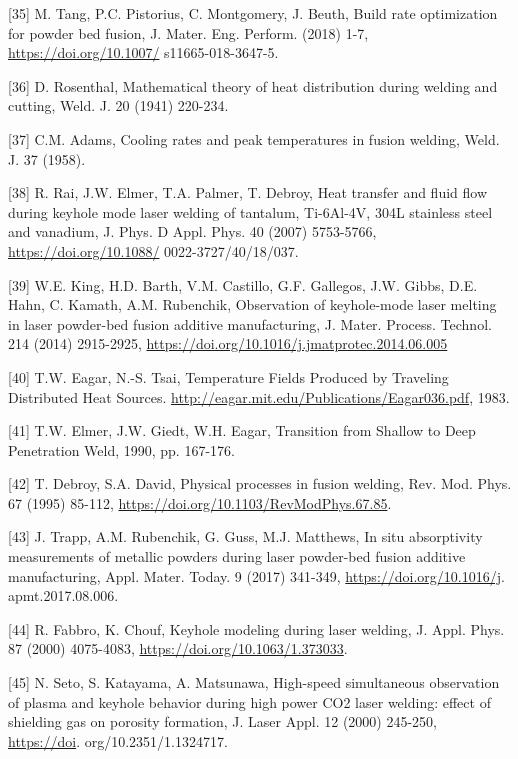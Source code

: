 \documentclass[10pt]{article}
\begin{document}
[35] M. Tang, P.C. Pistorius, C. Montgomery, J. Beuth, Build rate optimization for powder bed fusion, J. Mater. Eng. Perform. (2018) 1-7, \href{https://doi.org/10.1007/}{https://doi.org/10.1007/} s11665-018-3647-5.

[36] D. Rosenthal, Mathematical theory of heat distribution during welding and cutting, Weld. J. 20 (1941) 220-234.

[37] C.M. Adams, Cooling rates and peak temperatures in fusion welding, Weld. J. 37 (1958).

[38] R. Rai, J.W. Elmer, T.A. Palmer, T. Debroy, Heat transfer and fluid flow during keyhole mode laser welding of tantalum, Ti-6Al-4V, 304L stainless steel and vanadium, J. Phys. D Appl. Phys. 40 (2007) 5753-5766, \href{https://doi.org/10.1088/}{https://doi.org/10.1088/} 0022-3727/40/18/037.

[39] W.E. King, H.D. Barth, V.M. Castillo, G.F. Gallegos, J.W. Gibbs, D.E. Hahn, C. Kamath, A.M. Rubenchik, Observation of keyhole-mode laser melting in laser powder-bed fusion additive manufacturing, J. Mater. Process. Technol. 214 (2014) 2915-2925, \href{https://doi.org/10.1016/j.jmatprotec.2014.06.005}{https://doi.org/10.1016/j.jmatprotec.2014.06.005}

[40] T.W. Eagar, N.-S. Tsai, Temperature Fields Produced by Traveling Distributed Heat Sources. \href{http://eagar.mit.edu/Publications/Eagar036.pdf}{http://eagar.mit.edu/Publications/Eagar036.pdf}, 1983.

[41] T.W. Elmer, J.W. Giedt, W.H. Eagar, Transition from Shallow to Deep Penetration Weld, 1990, pp. 167-176.

[42] T. Debroy, S.A. David, Physical processes in fusion welding, Rev. Mod. Phys. 67 (1995) 85-112, \href{https://doi.org/10.1103/RevModPhys.67.85}{https://doi.org/10.1103/RevModPhys.67.85}.

[43] J. Trapp, A.M. Rubenchik, G. Guss, M.J. Matthews, In situ absorptivity measurements of metallic powders during laser powder-bed fusion additive manufacturing, Appl. Mater. Today. 9 (2017) 341-349, \href{https://doi.org/10.1016/j}{https://doi.org/10.1016/j}. apmt.2017.08.006.

[44] R. Fabbro, K. Chouf, Keyhole modeling during laser welding, J. Appl. Phys. 87 (2000) 4075-4083, \href{https://doi.org/10.1063/1.373033}{https://doi.org/10.1063/1.373033}.

[45] N. Seto, S. Katayama, A. Matsunawa, High-speed simultaneous observation of plasma and keyhole behavior during high power CO2 laser welding: effect of shielding gas on porosity formation, J. Laser Appl. 12 (2000) 245-250, \href{https://doi}{https://doi}. org/10.2351/1.1324717.
\end{document}

